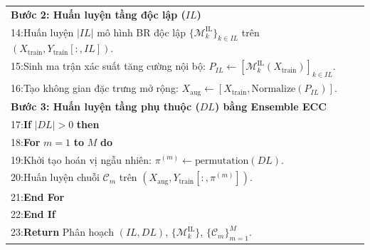 \documentclass[11pt,a4paper]{article}
\begin{document}
\begin{table}[!htbp]
\begin{tabular}{p{}}
\addlinespace
\textbf{Bước 2: Huấn luyện tầng độc lập ($IL$)} \\
14:\quad Huấn luyện $|IL|$ mô hình BR độc lập $\{\mathcal{M}_k^{\text{IL}}\}_{k \in IL}$ trên $(X_{\text{train}}, Y_{\text{train}}[:, IL])$. \\
15:\quad Sinh ma trận xác suất tăng cường nội bộ: $P_{IL} \leftarrow [\mathcal{M}_k^{\text{IL}}(X_{\text{train}})]_{k \in IL}$. \\
16:\quad Tạo không gian đặc trưng mở rộng: $X_{\text{aug}} \leftarrow [X_{\text{train}}, \text{Normalize}(P_{IL})]$. \\
\addlinespace
\textbf{Bước 3: Huấn luyện tầng phụ thuộc ($DL$) bằng Ensemble ECC} \\
17:\quad \textbf{If} $|DL| > 0$ \textbf{then} \\
18:\quad\quad \textbf{For} $m = 1$ \textbf{to} $M$ \textbf{do} \\
19:\quad\quad\quad Khởi tạo hoán vị ngẫu nhiên: $\pi^{(m)} \leftarrow \text{permutation}(DL)$. \\
20:\quad\quad\quad Huấn luyện chuỗi $\mathcal{C}_m$ trên $(X_{\text{aug}}, Y_{\text{train}}[:, \pi^{(m)}])$. \\
21:\quad\quad \textbf{End For} \\
22:\quad \textbf{End If} \\
23:\quad \textbf{Return} Phân hoạch $(IL, DL)$, $\{\mathcal{M}_k^{\text{IL}}\}$, $\{\mathcal{C}_m\}_{m=1}^M$. \\
\bottomrule
\end{tabular}
\end{table}
\end{document}

